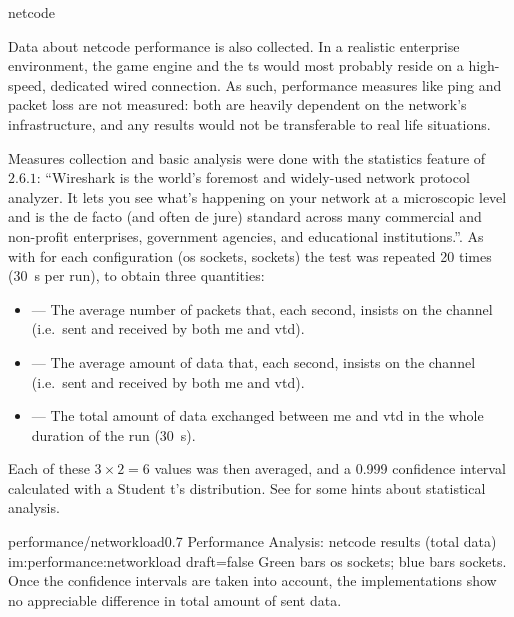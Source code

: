 \begin{definition}{netcode}
\end{definition}



Data about \gls{netcode} performance is also collected. In a realistic enterprise environment, the game engine and the \gls{ts} would most probably reside on a high-speed, dedicated wired connection. As such, performance measures like ping and packet loss are not measured: both are heavily dependent on the network's infrastructure, and any results would not be transferable to real life situations.

Measures collection and basic analysis were done with the statistics feature of  $2.6.1$: \enquote{Wireshark is the world’s foremost and widely-used network protocol analyzer. It lets you see what’s happening on your network at a microscopic level and is the de facto (and often de jure) standard across many commercial and non-profit enterprises, government agencies, and educational institutions.}{\cite{performance:wireshark}}. As with  for each configuration (\gls{os} sockets,  sockets) the test was repeated \num{20} times (\SI{30}{\second} per run), to obtain three quantities:

\begin{itemize}
	\item {} --- The average number of packets that, each second, insists on the channel (i.e.\ sent and received by both \gls{me} and \gls{vtd}).
	\item {} --- The average amount of data that, each second, insists on the channel (i.e.\ sent and received by both \gls{me} and \gls{vtd}).
	\item {} --- The total amount of data exchanged between \gls{me} and \gls{vtd} in the whole duration of the run (\SI{30}{\second}).
\end{itemize}

\FLOATnoindent Each of these $3\times2=6$ values was then averaged, and a \num{0,999} confidence interval calculated with a Student t's distribution. See  for some hints about statistical analysis.

\begin{image}
	{performance/networkload}{0.7}
	{Performance Analysis: \gls{netcode} results (total data)}
	{im:performance:networkload}
	{draft=false}
	{Green bars \gls{os} sockets; blue bars  sockets. Once the confidence intervals are taken into account, the implementations show no appreciable difference in total amount of sent data.}
\end{image}

